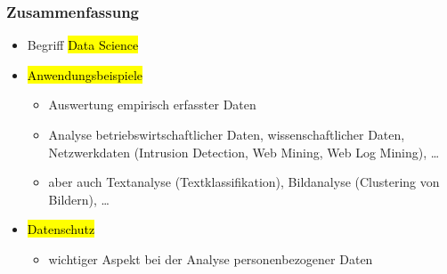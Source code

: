 \begin{frame}
\frametitle{Zusammenfassung}

\begin{itemize}
\item Begriff \hl{Data Science}
\item \hl{Anwendungsbeispiele}
\begin{itemize}
\item Auswertung empirisch erfasster Daten
\item Analyse betriebswirtschaftlicher Daten, wissenschaftlicher
  Daten, Netzwerkdaten (Intrusion Detection, Web Mining, Web Log
  Mining), \dots
\item aber auch Textanalyse (Textklassifikation), Bildanalyse
  (Clustering von Bildern), \dots
\end{itemize}
\item \hl{Datenschutz}
\begin{itemize}
\item wichtiger Aspekt bei der Analyse personenbezogener Daten
\end{itemize}
\end{itemize}

\end{frame}


